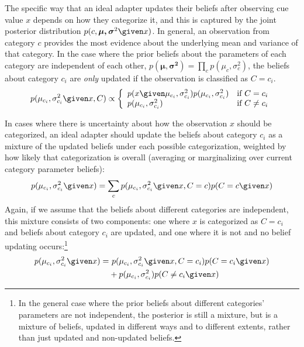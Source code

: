 The specific way that an ideal adapter updates their beliefs after observing cue value $x$ depends on how they categorize it, and this is captured by the joint posterior distribution $p(c, \boldsymbol{\mu, \sigma}^2 \given x)$.  In general, an observation from category $c$ provides the most evidence about the underlying mean and variance of that category.  In the case where the prior beliefs about the parameters of each category are independent of each other, $p(\boldsymbol{\mu, \sigma^2}) = \prod_c p(\mu_c, \sigma^2_c)$, the beliefs about category $c_i$ are \emph{only} updated if the observation is classified as $C=c_i$.
\begin{equation}
  \label{eq:20}
  p(\mu_{c_i}, \sigma^2_{c_i} \given x, C) \propto
  \left\{
    \begin{array}{lr}
      p(x\given \mu_{c_i}, \sigma^2_{c_i}) p(\mu_{c_i}, \sigma^2_{c_i}) & \textrm{if } C=c_i  \\
      p(\mu_{c_i}, \sigma^2_{c_i}) & \textrm{if } C \neq c_i
    \end{array}
  \right.
\end{equation}

In cases where there is uncertainty about how the observation $x$ should be categorized, an ideal adapter should update the beliefs about category $c_i$ as a mixture of the updated beliefs under each possible categorization, weighted by how likely that categorization is overall (averaging or marginalizing over current category parameter beliefs):
\begin{equation}
  \label{eq:18}
  p(\mu_{c_i}, \sigma^2_{c_i} \given x) = \sum_c p(\mu_{c_i}, \sigma^2_{c_i} \given x, C=c) p(C=c \given x)
\end{equation}
Again, if we assume that the beliefs about different categories are independent, this mixture consists of two components: one where $x$ is categorized as $C=c_i$ and beliefs about category $c_i$ are updated, and one where it is not and no belief updating occurs:\footnote{In the general case where the prior beliefs about different categories' parameters are not independent, the posterior is still a mixture, but is a mixture of beliefs, updated in different ways and to different extents, rather than just updated and non-updated beliefs.}
\begin{align*}
  \label{eq:19}
  p(\mu_{c_i}, \sigma^2_{c_i} \given x) =&\ p(\mu_{c_i}, \sigma^2_{c_i} \given x, C=c_i) p(C=c_i \given x) \\
  &+ p(\mu_{c_i}, \sigma^2_{c_i}) p(C \neq c_i \given x)
\end{align*}

